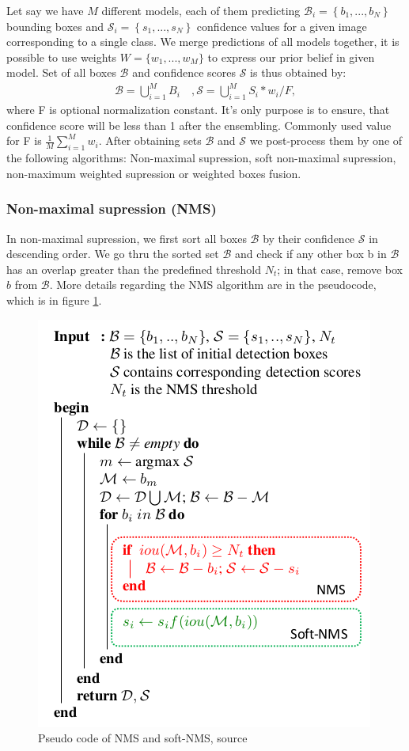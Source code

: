 Let say we have $M$ different models, each of them predicting $\mathcal{B}_i = \left\{b_1,...,b_N \right\} $ bounding boxes and $\mathcal{S}_i = \left\{ s_1,...,s_N \right\} $ confidence values for a given image corresponding to a single class. We merge predictions of all models together, it is possible to use weights $\mathit{W} = \{w_1,...,w_M \}$ to express our prior belief in given model. Set of all boxes $\mathcal{B}$ and confidence scores $\mathcal{S}$ is thus obtained by:
\begin{align}
    \mathcal{B} = \bigcup_{i=1}^{M} B_i \quad, \mathcal{S} = \bigcup_{i=1}^{M} S_i * w_i / F,
\end{align}
where F is optional normalization constant. It's only purpose is to ensure, that confidence score will be less than 1 after the ensembling. Commonly used value for F is $\frac{1}{M} \sum_{i=1}^M w_i$. After obtaining sets $\mathcal{B}$ and $\mathcal{S}$ we post-process them by one of the following algorithms: Non-maximal supression, soft non-maximal supression, non-maximum weighted supression or weighted boxes fusion.

\subsubsection{Non-maximal supression (NMS)}
In non-maximal supression, we first sort all boxes $\mathcal{B}$ by their confidence $\mathcal{S}$ in descending order. We go thru the sorted set $\mathcal{B}$ and check if any other box b in $\mathcal{B}$ has an overlap greater than the predefined threshold $N_t$; in that case, remove box $b$ from $\mathcal{B}$. More details regarding the NMS algorithm are in the pseudocode, which is in figure \ref{alg:nms}.
\begin{figure}
    \centering
    \includegraphics{images/nms_algo.png}
    \caption{Pseudo code of NMS and soft-NMS, source \cite{Bodla2017}}
    \label{alg:nms}
\end{figure}

